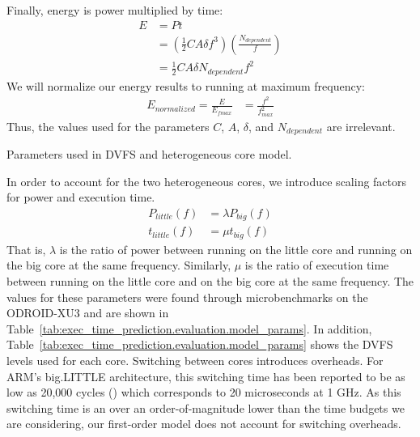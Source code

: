 Finally, energy is power multiplied by time:
\begin{align*}
  E &= Pt \\
    &= \left(\frac{1}{2}CA\delta f^3\right) \left(\frac{N_{dependent}}{f}\right) \\
    &= \frac{1}{2}CA\delta N_{dependent}f^2
\end{align*}
We will normalize our energy results to running at maximum frequency:
\begin{align*}
  E_{normalized} = \frac{E}{E_{fmax}} &= \frac{f^2}{f_{max}^2}
\end{align*}
Thus, the values used for the parameters $C$, $A$, $\delta$, and
$N_{dependent}$ are irrelevant.

\begin{table}
  \begin{center}
    \begin{footnotesize}
    
    \end{footnotesize}
    \caption{Parameters used in DVFS and heterogeneous core model.}
    \label{tab:exec_time_prediction.evaluation.model_params}
  \end{center}
\end{table}

In order to account for the two heterogeneous cores, we introduce scaling
factors for power and execution time.
\begin{align*}
  P_{little}(f) &= \lambda P_{big}(f) \\
  t_{little}(f) &= \mu t_{big}(f)
\end{align*}
That is, $\lambda$ is the ratio of power between running on the little core and
running on the big core at the same frequency. Similarly, $\mu$ is the ratio
of execution time between running on the little core and on the big core at the
same frequency. The values for these parameters were found through
microbenchmarks on the ODROID-XU3 and are shown in
Table~\ref{tab:exec_time_prediction.evaluation.model_params}. In addition,
Table~\ref{tab:exec_time_prediction.evaluation.model_params} shows the DVFS
levels used for each core. Switching between cores introduces overheads. For
ARM's big.LITTLE architecture, this switching time has been reported to be as
low as 20,000 cycles (\cite{cho-12}) which corresponds to 20 microseconds at 1
GHz. As this switching time is an over an order-of-magnitude lower than the
time budgets we are considering, our first-order model does not account for
switching overheads.


